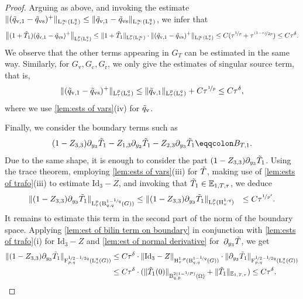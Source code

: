 \documentclass[10pt]{amsart}
\theoremstyle{plain}
\theoremstyle{definition}
\theoremstyle{thm}
\numberwithin{equation}{section}
\newcommand{\rL}{\mathrm{L}}
\newcommand{\rLq}{\rL^q}
\newcommand{\rH}{\mathrm{H}}
\newcommand{\rB}{\mathrm{B}}
\newcommand{\rF}{\mathrm{F}}
\newcommand{\E}{\mathbb{E}}
\newcommand{\del}{\partial}
\newcommand{\rr}{\mathrm{r}}
\newcommand{\rv}{\mathrm{v}}
\newcommand{\rvs}{\mathrm{vs}}
\newcommand{\rc}{\mathrm{c}}
\newcommand{\tT}{\Tilde{T}}
\newcommand{\tq}{\Tilde{q}}
\begin{document}
\begin{proof}
Arguing as above, and invoking the estimate $\|(\tq_{\rv,1}-\tq_{\rvs})^+\|_{\rL^\infty_\tau(\rLq_x)}\leq \|\tq_{\rv,1}-\tq_{\rvs}\|_{\rL^\infty_\tau(\rLq_x)}$, we infer that 
\begin{equation*}
    \begin{aligned}
       \left\|(1+\tT_1)(\tq_{\rv,1} - \tq_{\rvs})^+\right\|_{\rL_\tau^p(\rL_x^{q})}
       \leq \|1+\tT_1\|_{\rL_\tau^p(\rL_x^\infty)}\cdot\|(\tq_{\rv,1} - \tq_{\rvs})^+\|_{\rL_\tau^\infty(\rL_x^q)}
       \leq C (\tau^{\nicefrac{1}{p}}+\tau^{\nicefrac{(1-s)}{2p}})\leq C\tau^\delta.
    \end{aligned}
\end{equation*}
We observe that the other terms appearing in \( G_T \) can be estimated in the same way.
Similarly, for $G_\rv,G_\rc,G_\rr$, we only give the estimates of singular source term, that is,
 \begin{equation*}\|(\tq_{\rv,1}-\tq_\rvs)^{+}\|_{\rL_\tau^p(\rL_x^{q})}\leq \|\tq_{\rv,1}\|_{\rL_\tau^p(\rL_x^{q})}+C\tau^{\nicefrac{1}{p}}\leq C \tau^\delta, 
 \end{equation*} 
where we use \autoref{lem:ests of vars}(iv) for $\tq_\rv$.

Finally, we consider the boundary terms such as
\begin{equation*}
    (1-Z_{3,3}) \del_{y_3} \tT_{1} - Z_{1,3} \del_{y_2} \tT_{1} - Z_{2,3} \del_{y_3} \tT_{1} \eqqcolon B_{T,1}.
\end{equation*}
Due to the same shape, it is enough to consider the part $(1-Z_{3,3}) \del_{y_3} \tT_{1} $.
Using the trace theorem, employing \autoref{lem:ests of vars}(iii) for $\tT$, making use of \autoref{lem:ests of trafo}(iii) to estimate $\mathrm{Id}_3 - Z$, and invoking that $\tT_{1} \in \E_{1,T,\tau}$, we deduce
\begin{equation*}
    \begin{aligned}
        \| (1-Z_{3,3}) \del_{y_3} \tT_{1} \|_{\rL_\tau^p(\rB_{q,q}^{1 - \nicefrac{1}{q}}(G))}
        &\leq \| (1-Z_{3,3}) \del_{y_3} \tT_{1} \|_{\rL_\tau^p(\rH_x^{1 ,q})}
        &\leq C\tau^{\nicefrac{1}{p'}}.
    \end{aligned}
\end{equation*}
It remains to estimate this term in the second part of the norm of the boundary space. 
Applying \autoref{lem:est of bilin term on boundary} in conjunction with \autoref{lem:ests of trafo}(i) for $\mathrm{Id}_3-Z$ and \autoref{lem:est of normal derivative} for~$\del_{y_3} \tT$, we get
\begin{equation*}
    \begin{aligned}
        \| (1-Z_{3,3}) \del_{y_3} \tT_{1} \|_{\rF_{p,q}^{\nicefrac{1}{2}-\nicefrac{1}{2q}}(\rL_x^q(G))}
        &\leq C\tau^{\delta} \cdot \|\mathrm{Id}_3-Z\|_{\rH_\tau^{1,p}(\rB_{q,q}^{1 - \nicefrac{1}{q}}(G))} \cdot \|\del_{y_3}\tT_{1}\|_{\rF_{p,q}^{\nicefrac{1}{2}-\nicefrac{1}{2q}}(\rL_x^q(G))}\\
        &\leq C\tau^{\delta}\cdot (\|\tT_{1}(0)\|_{\rB_{q,p}^{2(1 - \nicefrac{1}{P})}(\Omega)}+\|\tT_{1}\|_{\E_{1,T,\tau}})
        \leq C\tau^{\delta}.
    \end{aligned}
\end{equation*}


\end{proof}
\end{document}
